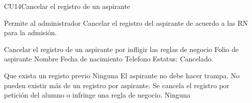 \begin{UseCase}{CU14}{Cancelar el registro de un aspirante} {  %
	
	Permite al administrador Cancelar el registro del aspirante de acuerdo a las RN para la admisión.


}
	


	
	{
	}
	{
		Cancelar el registro de un aspirante por infligir las reglas de negocio
	}
	{
		\UCli Folio de aspirante
	}
	{
		\UCli Nombre
		\UCli Fecha de nacimiento
		\UCli Telefono
		\UCli Estatus: Cancelado.
	}

	{
		\UCli Que exista un registo previo
	}
	{
		Ninguna
	}
	{
		\UCli El aspirante no debe hacer trampa. No pueden existir más de un registro por aspirante. Se cancela el registro por petición del alumno o infringe una regla de negocio. 
	}
	{
		Ninguna
	}
\end{UseCase}


